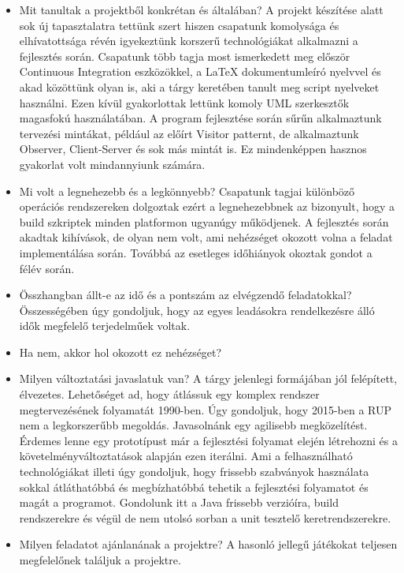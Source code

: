 \begin{itemize}
\item Mit tanultak a projektből konkrétan és általában? \newline
A projekt készítése alatt sok új tapasztalatra tettünk szert hiszen csapatunk komolysága és elhívatottsága révén igyekeztünk korszerű technológiákat alkalmazni a fejlesztés során. Csapatunk több tagja most ismerkedett meg először Continuous Integration eszközökkel, a LaTeX dokumentumleíró nyelvvel és akad közöttünk olyan is, aki a tárgy keretében tanult meg script nyelveket használni. Ezen kívül gyakorlottak lettünk komoly UML szerkesztők magasfokú használatában. 
A program fejlesztése során sűrűn alkalmaztunk tervezési mintákat, például az előírt Visitor patternt, de alkalmaztunk Observer, Client-Server és sok más mintát is. Ez mindenképpen hasznos gyakorlat volt mindannyiunk számára.

\item Mi volt a legnehezebb és a legkönnyebb? \newline
Csapatunk tagjai különböző operációs rendszereken dolgoztak ezért a legnehezebbnek az bizonyult, hogy a build szkriptek minden platformon ugyanúgy működjenek. A fejlesztés során akadtak kihívások, de olyan nem volt, ami nehézséget okozott volna a feladat implementálása során. Továbbá az esetleges időhiányok okoztak gondot a félév során.

\item Összhangban állt-e az idő és a pontszám az elvégzendő feladatokkal? \newline
Összességében úgy gondoljuk, hogy az egyes leadásokra rendelkezésre álló idők megfelelő terjedelműek voltak.

\item Ha nem, akkor hol okozott ez nehézséget? \newline
\item Milyen változtatási javaslatuk van? \newline
A tárgy jelenlegi formájában jól felépített, élvezetes. Lehetőséget ad, hogy átlássuk egy komplex rendszer megtervezésének folyamatát 1990-ben.
Úgy gondoljuk, hogy 2015-ben a RUP nem a legkorszerűbb megoldás. Javasolnánk egy agilisebb megközelítést. Érdemes lenne egy prototípust már a fejlesztési folyamat elején létrehozni és a követelményváltoztatások alapján ezen iterálni.
Ami a felhasználható technológiákat illeti úgy gondoljuk, hogy frissebb szabványok használata sokkal átláthatóbbá és megbízhatóbbá tehetik a fejlesztési folyamatot és magát a programot. Gondolunk itt a Java frissebb verzióíra, build rendszerekre és végül de nem utolsó sorban a unit tesztelő keretrendszerekre. 

\item Milyen feladatot ajánlanának a projektre? \newline
A hasonló jellegű játékokat teljesen megfelelőnek találjuk a projektre.

\end{itemize}


